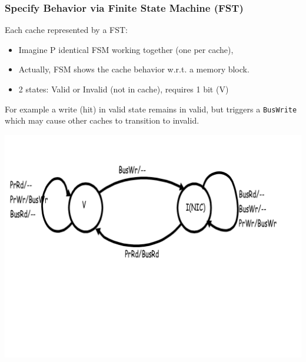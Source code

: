 \documentclass{beamer}
\begin{document}
\begin{frame}[fragile,t]
\frametitle{Specify Behavior via Finite State Machine (FST)}


Each cache represented by a FST:
\begin{itemize}
    \item Imagine P identical FSM working together (one per cache), 
    \item Actually, FSM shows the cache behavior w.r.t. a memory block.
    \item 2 states: Valid or Invalid (not in cache), requires 1 bit (V)
\end  {itemize}
\bigskip

For example a write (hit) in valid state remains in valid, but
triggers a {\tt BusWrite} which may cause other caches to transition
to invalid. 

\includegraphics[width=59ex]{FigsInfCoherence/SimpleCohProt}

\end{frame}
\end{document}
